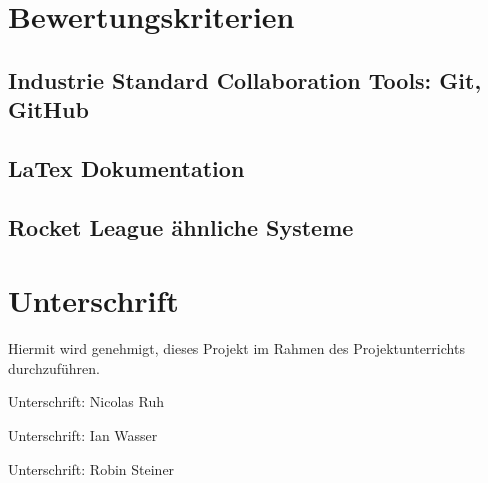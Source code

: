 \documentclass{article}
\begin{document}
\section{Bewertungskriterien}
\subsection{Industrie Standard Collaboration Tools: Git, GitHub}
\label{chap:git_github}

\subsection{LaTex Dokumentation}

\subsection{Rocket League ähnliche Systeme}

\section{Unterschrift}
\label{chap:unterschrift}

Hiermit wird genehmigt, dieses Projekt im Rahmen des Projektunterrichts
durchzuführen.

\vspace*{1cm}

Unterschrift: \hrulefill Nicolas Ruh \vspace*{2cm}

Unterschrift: \hrulefill Ian Wasser \vspace*{2cm}

Unterschrift: \hrulefill Robin Steiner \vspace*{2cm}

\printbibliography[heading=bibintoc]
\end{document}
